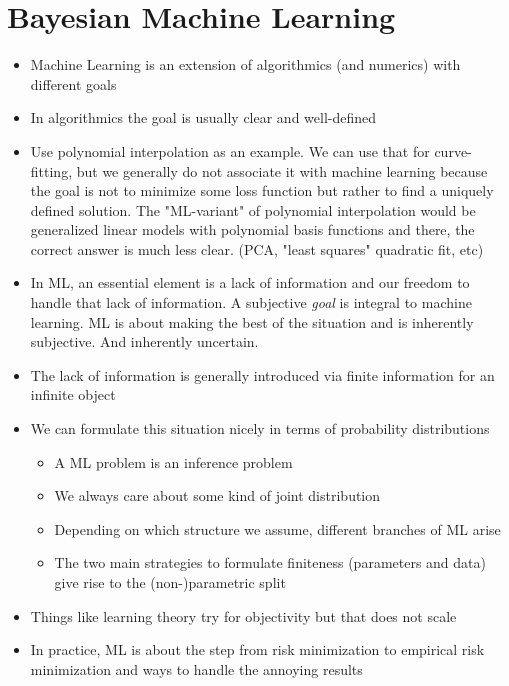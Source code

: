 \chapter{Bayesian Machine Learning}
\label{toc:bayesian_ml}

\begin{itemize}
    \item Machine Learning is an extension of algorithmics (and numerics) with different goals
    \item In algorithmics the goal is usually clear and well-defined
    \item Use polynomial interpolation as an example.
          We can use that for curve-fitting, but we generally do not associate it with machine learning because the goal is not to minimize some loss function but rather to find a uniquely defined solution.
          The "ML-variant" of polynomial interpolation would be generalized linear models with polynomial basis functions and there, the correct answer is much less clear. (PCA, "least squares" quadratic fit, etc)
    \item In ML, an essential element is a lack of information and our freedom to handle that lack of information. A subjective \emph{goal} is integral to machine learning. ML is about making the best of the situation and is inherently subjective. And inherently uncertain.
    \item The lack of information is generally introduced via finite information for an infinite object
    \item We can formulate this situation nicely in terms of probability distributions
          \begin{itemize}
              \item A ML problem is an inference problem
              \item We always care about some kind of joint distribution
              \item Depending on which structure we assume, different branches of ML arise
              \item The two main strategies to formulate finiteness (parameters and data) give rise to the (non-)parametric split
          \end{itemize}
    \item Things like learning theory try for objectivity but that does not scale
    \item In practice, ML is about the step from risk minimization to empirical risk minimization and ways to handle the annoying results

\end{itemize}
